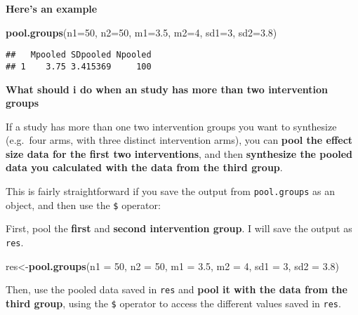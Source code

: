 \documentclass[]{book}
\newenvironment{Shaded}{\begin{snugshade}}{\end{snugshade}}
\newcommand{\KeywordTok}[1]{\textcolor[rgb]{0.13,0.29,0.53}{\textbf{#1}}}
\newcommand{\DataTypeTok}[1]{\textcolor[rgb]{0.13,0.29,0.53}{#1}}
\newcommand{\DecValTok}[1]{\textcolor[rgb]{0.00,0.00,0.81}{#1}}
\newcommand{\FloatTok}[1]{\textcolor[rgb]{0.00,0.00,0.81}{#1}}
\newcommand{\NormalTok}[1]{#1}
\theoremstyle{definition}
\theoremstyle{definition}
\theoremstyle{definition}
\theoremstyle{remark}
\begin{document}
\textbf{Here's an example}

\begin{Shaded}
\begin{Highlighting}[]
\KeywordTok{pool.groups}\NormalTok{(}\DataTypeTok{n1=}\DecValTok{50}\NormalTok{,}
            \DataTypeTok{n2=}\DecValTok{50}\NormalTok{,}
            \DataTypeTok{m1=}\FloatTok{3.5}\NormalTok{,}
            \DataTypeTok{m2=}\DecValTok{4}\NormalTok{,}
            \DataTypeTok{sd1=}\DecValTok{3}\NormalTok{,}
            \DataTypeTok{sd2=}\FloatTok{3.8}\NormalTok{)}
\end{Highlighting}
\end{Shaded}

\begin{verbatim}
##   Mpooled SDpooled Npooled
## 1    3.75 3.415369     100
\end{verbatim}

\begin{rmdinfo}
\textbf{What should i do when an study has more than two intervention
groups}

If a study has more than one two intervention groups you want to
synthesize (e.g.~four arms, with three distinct intervention arms), you
can \textbf{pool the effect size data for the first two interventions},
and then \textbf{synthesize the pooled data you calculated with the data
from the third group}.

This is fairly straightforward if you save the output from
\texttt{pool.groups} as an object, and then use the \texttt{\$}
operator:
\end{rmdinfo}

First, pool the \textbf{first} and \textbf{second intervention group}. I
will save the output as \texttt{res}.

\begin{Shaded}
\begin{Highlighting}[]
\NormalTok{res<-}\KeywordTok{pool.groups}\NormalTok{(}\DataTypeTok{n1 =} \DecValTok{50}\NormalTok{,}
            \DataTypeTok{n2 =} \DecValTok{50}\NormalTok{,}
            \DataTypeTok{m1 =} \FloatTok{3.5}\NormalTok{,}
            \DataTypeTok{m2 =} \DecValTok{4}\NormalTok{,}
            \DataTypeTok{sd1 =} \DecValTok{3}\NormalTok{,}
            \DataTypeTok{sd2 =} \FloatTok{3.8}\NormalTok{)}
\end{Highlighting}
\end{Shaded}

Then, use the pooled data saved in \texttt{res} and \textbf{pool it with
the data from the third group}, using the \texttt{\$} operator to access
the different values saved in \texttt{res}.
\end{document}
